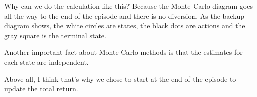 \begin{minipage}[c]{0.9\textwidth}
    Why can we do the calculation like this? Because the Monte Carlo diagram goes all the way to the end of the episode and there is no diversion. As the backup diagram shows, the white circles are states, the black dots are actions and the gray square is the terminal state.

    \vspace{1em}
    Another important fact about Monte Carlo methods is that the estimates for each state are independent.
    
    \vspace{1em}
    Above all, I think that's why we chose to start at the end of the episode to update the total return.
\end{minipage}
\hfill
\begin{minipage}[c]{0.1\textwidth}

\end{minipage}
